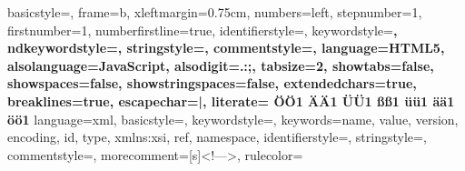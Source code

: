  {%
  basicstyle={\footnotesize\ttfamily},   
  frame=b,
  xleftmargin={0.75cm},
  numbers=left,
  stepnumber=1,
  firstnumber=1,
  numberfirstline=true,	
  identifierstyle=\color{black},
  keywordstyle=\color{blue}\bfseries,
  ndkeywordstyle=\color{editorGreen}\bfseries,
  stringstyle=\color{editorOcher}\ttfamily,
  commentstyle=\color{brown}\ttfamily,
  language=HTML5,
  alsolanguage=JavaScript,
  alsodigit={.:;},	
  tabsize=2,
  showtabs=false,
  showspaces=false,
  showstringspaces=false,
  extendedchars=true,
  breaklines=true,  
  escapechar=|,
  literate=%
  {Ö}{{\"O}}1
  {Ä}{{\"A}}1
  {Ü}{{\"U}}1
  {ß}{{\ss}}1
  {ü}{{\"u}}1
  {ä}{{\"a}}1
  {ö}{{\"o}}1
}
{
	language=xml,
	basicstyle=\fontsize{9pt}{9pt}\selectfont\color{kommentgreen},
	keywordstyle=\color{lila},  	%
	keywords={name, value, version, encoding, id, type, xmlns:xsi, ref, namespace},
	identifierstyle=\color{black},  
	stringstyle=\color{blue},  
	commentstyle=\color{lightblue},
	morecomment=[s]{<!--}{-->},
	rulecolor=\color{black}
}





\usepackage{multicol}

\usepackage{nameref}

\usepackage{hyperref}
\hypersetup{breaklinks=true}
\hypersetup{colorlinks=true,linkcolor=black,urlcolor=black,citecolor=black}


